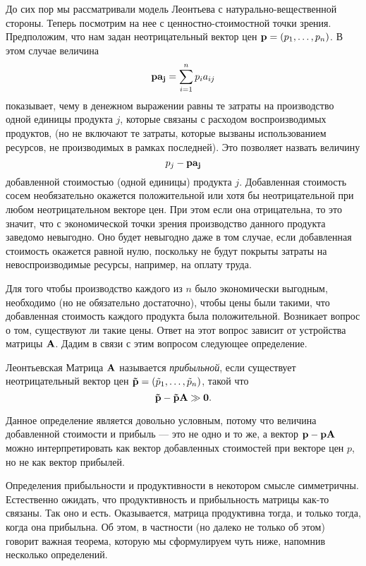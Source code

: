     До сих пор мы рассматривали модель Леонтьева с
    натурально-вещественной стороны. Теперь посмотрим на нее с
    ценностно-стоимостной точки зрения. Предположим, что нам задан
    неотрицательный вектор цен $\mathbf{p}=(p_{1},\ldots,p_{n})$.
    В этом случае величина
    \[\mathbf{p}\mathbf{a_{j}}=\sum_{i=1}^{n}p_{i}a_{ij}\]
    показывает, чему в денежном выражении равны те затраты на
    производство одной единицы продукта $j$, которые связаны с
    расходом воспроизводимых продуктов,  (но не включают те
    затраты, которые вызваны
    использованием ресурсов, не производимых в рамках последней).
    Это позволяет назвать величину
    \[p_{j}-\mathbf{p}\mathbf{a_{j}}\]
    добавленной стоимостью (одной единицы) продукта $j$. Добавленная
    стоимость сосем необязательно окажется положительной или хотя бы
    неотрицательной при любом неотрицательном векторе цен. При этом
    если она отрицательна, то это значит, что с экономической точки
    зрения производство данного продукта заведомо невыгодно. Оно
    будет невыгодно даже в том случае, если добавленная стоимость
    окажется равной нулю, поскольку не будут покрыты затраты
    на невоспроизводимые ресурсы, например, на оплату труда.

    Для того чтобы производство каждого из $n$ было экономически
    выгодным, необходимо (но не обязательно достаточно), чтобы цены
    были такими, что добавленная стоимость каждого продукта была
    положительной. Возникает вопрос о том, существуют ли такие цены.
    Ответ на этот вопрос зависит от устройства матрицы $\mathbf{A}$.
    Дадим в связи с этим вопросом следующее определение.

    Леонтьевская Матрица $\mathbf{A}$ называется \emph{прибыльной},
    если существует неотрицательный
    вектор цен $\mathbf{\tilde{p}}=(\tilde{p}_{1},\ldots,\tilde{p}_{n})$, такой что
    \[\mathbf{\tilde{p}}-\mathbf{\tilde{p}}\mathbf{A}\gg\mathbf{0}.\]

    Данное определение является довольно условным, потому что
    величина добавленной стоимости и прибыль --- это не одно и то
    же, а вектор $\mathbf{p}-\mathbf{p}\mathbf{A}$ можно интерпретировать как
    вектор добавленных стоимостей при векторе цен $p$, но не как вектор прибылей.

    Определения прибыльности и продуктивности в некотором смысле
    симметричны. Естественно ожидать, что продуктивность и
    прибыльность матрицы как-то связаны. Так оно и есть. Оказывается, матрица
    продуктивна тогда, и только тогда, когда она прибыльна. Об этом,
    в частности (но далеко не только об этом) говорит важная
    теорема, которую мы сформулируем чуть ниже, напомнив несколько определений.

